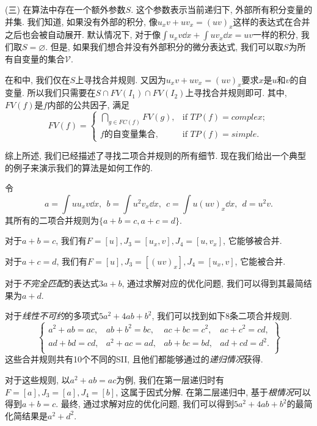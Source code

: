 (三) 在算法中存在一个额外参数$S$. 这个参数表示当前递归下, 外部所有积分变量的并集. 我们知道, 如果没有外部的积分, 像$u_x v + u v_x = (uv)_x$这样的表达式在合并之后也会被自动展开. 默认情况下, 对于像$\int\!{u_x v\dd x} + \int\!{u v_x\dd x} = uv$一样的积分, 我们取$S=\varnothing$. 但是, 如果我们想合并没有外部积分的微分表达式, 我们可以取$S$为所有自变量的集合$\mathcal{V}$.  

在和中, 我们仅在$S$上寻找合并规则. 又因为$u_x v + u v_x = (uv)_x$要求$x$是$u$和$v$的自变量. 所以我们只需要在$S\cap FV(I_1) \cap FV(I_2)$上寻找合并规则即可. 其中, $FV(f)$是$f$内部的公共因子, 满足
\begin{equation}    
FV(f)=\left\{
\begin{array}{cl}
\bigcap\limits_{g\in FC(f)}{FV(g)}, &\text{if }TP(f)=complex;\\ 
f\text{的自变量集合},          &\text{if }TP(f)=simple.
\end{array}
\right.
\end{equation}

综上所述, 我们已经描述了寻找二项合并规则的所有细节. 现在我们给出一个典型的例子来演示我们的算法是如何工作的.

\begin{example} \label{eg-4-1}
令
\begin{equation}
a=\int\!{uu_xv \dd x},~~b=\int\!{u^2v_x\dd x},~~c=\int\!{u(uv)_x\dd x},~~d=u^2v.
\end{equation}
其所有的二项合并规则为$\{a+b=c,a+c=d\}$. 

对于$a+b=c$, 我们有$F=[u],J_3=[u_x,v],J_4=[u,v_x]$, 它能够被合并.

对于$a+c=d$, 我们有$F=[u],J_3=[(uv)_x],J_4=[u_x,v]$, 它能被合并.  

对于\emph{不完全匹配}的表达式$3a+b$, 通过求解对应的优化问题, 我们可以得到其最简结果为$a+d$.

对于\emph{线性不可约}的多项式$5a^2+4ab+b^2$, 我们可以找到如下8条二项合并规则.
\begin{equation}
\left\{ 
\begin{matrix}
a^2+ab=ac, &ab+b^2=bc, &ac+bc=c^2, &ac+c^2=cd,\\
ad+bd=cd,  &a^2+ac=ad, &ab+bc=bd,  &ad+cd=d^2.\\ 
\end{matrix}
\right\}
\end{equation}
这些合并规则共有10个不同的SII, 且他们都能够通过的\emph{递归情况}获得. 

对于这些规则, 以$a^2+ab=ac$为例, 我们在第一层递归时有$F=[a],J_3=[a],J_4=[b]$, 这属于因式分解. 在第二层递归中, 基于\emph{根情况}可以得到$a+b=c$. 最终, 通过求解对应的优化问题, 我们可以得到$5a^2+4ab+b^2$的最简化简结果是$a^2+d^2$.
\end{example}  

